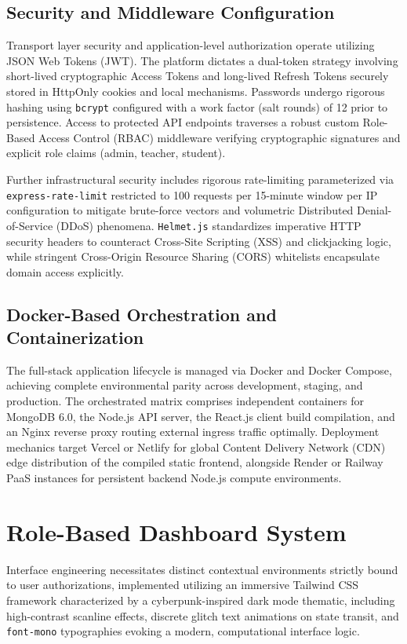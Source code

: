\documentclass[12pt, journal, onecolumn]{IEEEtran}
\begin{document}
\subsection{Security and Middleware Configuration}
Transport layer security and application-level authorization operate utilizing JSON Web Tokens (JWT). The platform dictates a dual-token strategy involving short-lived cryptographic Access Tokens and long-lived Refresh Tokens securely stored in HttpOnly cookies and local mechanisms. Passwords undergo rigorous hashing using \texttt{bcrypt} configured with a work factor (salt rounds) of 12 prior to persistence. Access to protected API endpoints traverses a robust custom Role-Based Access Control (RBAC) middleware verifying cryptographic signatures and explicit role claims (admin, teacher, student). 

Further infrastructural security includes rigorous rate-limiting parameterized via \texttt{express-rate-limit} restricted to 100 requests per 15-minute window per IP configuration to mitigate brute-force vectors and volumetric Distributed Denial-of-Service (DDoS) phenomena. \texttt{Helmet.js} standardizes imperative HTTP security headers to counteract Cross-Site Scripting (XSS) and clickjacking logic, while stringent Cross-Origin Resource Sharing (CORS) whitelists encapsulate domain access explicitly.

\subsection{Docker-Based Orchestration and Containerization}
The full-stack application lifecycle is managed via Docker and Docker Compose, achieving complete environmental parity across development, staging, and production. The orchestrated matrix comprises independent containers for MongoDB 6.0, the Node.js API server, the React.js client build compilation, and an Nginx reverse proxy routing external ingress traffic optimally. Deployment mechanics target Vercel or Netlify for global Content Delivery Network (CDN) edge distribution of the compiled static frontend, alongside Render or Railway PaaS instances for persistent backend Node.js compute environments.

\section{Role-Based Dashboard System}
Interface engineering necessitates distinct contextual environments strictly bound to user authorizations, implemented utilizing an immersive Tailwind CSS framework characterized by a cyberpunk-inspired dark mode thematic, including high-contrast scanline effects, discrete glitch text animations on state transit, and \texttt{font-mono} typographies evoking a modern, computational interface logic.
\end{document}
